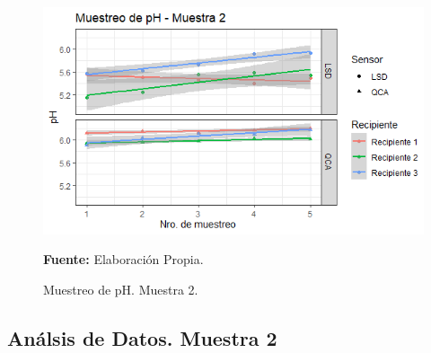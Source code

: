     \begin{figure}[H]
        \centering
        \includegraphics[width=0.75\linewidth]{Imagenes/cap4/pH_M2.png}
        \caption {Muestreo de pH. Muestra 2. }{\textbf{Fuente:}
        Elaboraci\'on Propia. }
        \label{fig:M2PH}
    \end{figure}

\subsection{An\'alsis de Datos. Muestra 2}

